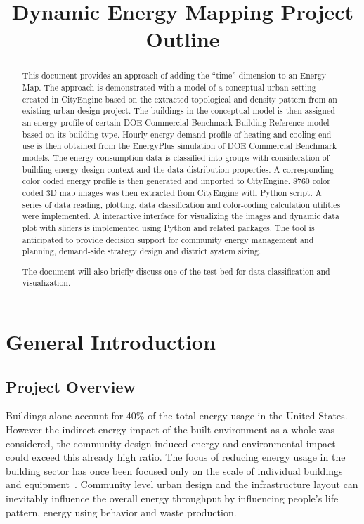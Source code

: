 \documentclass[hidelinks,12pt]{article}
\begin{document}
\title{Dynamic Energy Mapping Project Outline}
\maketitle
\tableofcontents
\newpage
\begin{abstract}
  This document provides an approach of adding the ``time'' dimension
  to an Energy Map. The approach is demonstrated with a model of a
  conceptual urban setting created in CityEngine based on the
  extracted topological and density pattern from an existing urban
  design project. The buildings in the conceptual model is then
  assigned an energy profile of certain DOE Commercial Benchmark
  Building Reference model based on its building type. Hourly energy
  demand profile of heating and cooling end use is then obtained from
  the EnergyPlus simulation of DOE Commercial Benchmark models. The
  energy consumption data is classified into groups with consideration
  of building energy design context and the data distribution
  properties. A corresponding color coded energy profile is then
  generated and imported to CityEngine. 8760 color coded 3D map images
  was then extracted from CityEngine with Python script. A series of
  data reading, plotting, data classification and color-coding
  calculation utilities were implemented. A interactive interface for
  visualizing the images and dynamic data plot with sliders is
  implemented using Python and related packages. The tool is
  anticipated to provide decision support for community energy
  management and planning, demand-side strategy design and district
  system sizing.
  
  The document will also briefly discuss one of the test-bed for data
  classification and visualization.

\end{abstract}
\newpage

\section{General Introduction}
\subsection{Project Overview}
Buildings alone account for 40\% of the total energy usage in the
United States. However the indirect energy impact of the built
environment as a whole was considered, the community design induced
energy and environmental impact could exceed this already high
ratio. The focus of reducing energy usage in the building sector has
once been focused only on the scale of individual buildings and
equipment~\cite{Jaccard19971065}. Community level urban design and the
infrastructure layout can inevitably influence the overall energy
throughput by influencing people's life pattern, energy using behavior
and waste production.
\end{document}
